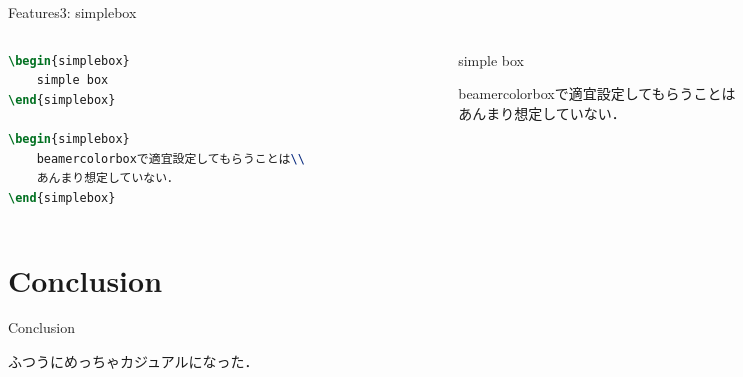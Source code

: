\documentclass[aspectratio=1610,14pt]{beamer}
\begin{document}
\begin{frame}[fragile]{Features3: simplebox}
    \begin{columns}
        \begin{column}{0.5\textwidth}
            \begin{lstlisting}[language=TeX]
\begin{simplebox}
    simple box
\end{simplebox}

\begin{simplebox}
    beamercolorboxで適宜設定してもらうことは\\
    あんまり想定していない．
\end{simplebox}
            \end{lstlisting}
        \end{column}
        \begin{column}{0.5\textwidth}
            \begin{simplebox}
                simple box
            \end{simplebox}
            \begin{simplebox}
                beamercolorboxで適宜設定してもらうことは\\
                あんまり想定していない．
            \end{simplebox}
        \end{column}
    \end{columns}
\end{frame}

\section{Conclusion}

\begin{frame}
    \tableofcontents[currentsection]
\end{frame}

\begin{frame}{Conclusion}
    \begin{textblock}{ふつうにめっちゃカジュアルになった．}
        \begin{itemize}
        \end{itemize}
    \end{textblock}
\end{frame}
%
%
%
%
\end{document}
